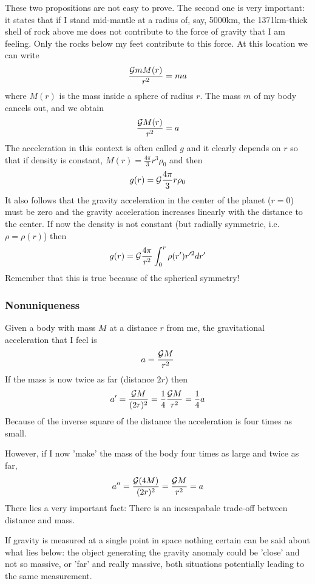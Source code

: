 These two propositions are not easy to prove. The second one is very important: it states
that if I stand mid-mantle at a radius of, say, 5000\si{\kilo\metre}, the 1371\si{\kilo\metre}-thick 
shell of rock above me does not contribute to the force of gravity that I am feeling. 
Only the rocks below my feet contribute to this force.
At this location we can write
\[
\frac{{\cal G}m M(r)}{r^2} = m a
\]
where $M(r)$ is the mass inside a sphere of radius $r$. The mass $m$ of my body cancels out, and we
obtain 
\[
\frac{{\cal G} M(r)}{r^2} = a
\]
The acceleration in this context is often called $g$ and it clearly depends on $r$ so that 
if density is constant, $M(r)=\frac{4\pi}{3}r^3\rho_0$ and then 
\[
g(r) = {\cal G} \frac{4\pi}{3}r\rho_0
\]
It also follows that the gravity acceleration in the center of the planet ($r=0$) must be zero and 
the gravity acceleration increases linearly with the distance to the center. 
If now the density is not constant (but radially symmetric, i.e. $\rho=\rho(r)$) then 
\[
g(r) =  {\cal G} \frac{4\pi}{r^2} \int_0^r \rho(r') r'^2 dr'
\]
Remember that this is true because of the spherical symmetry!

\subsubsection{Nonuniqueness}

Given a body with mass $M$ at a distance $r$ from me, the gravitational acceleration 
that I feel is 
\[
a = \frac{{\cal G} M}{r^2}
\]
If the mass is now twice as far (distance $2r$) then 
\[
a' = \frac{{\cal G} M}{(2r)^2} =  \frac{1}{4} \frac{{\cal G} M}{r^2} = \frac{1}{4}a
\]
Because of the inverse square of the distance the acceleration is four times as small. 

However, if I now 'make' the mass of the body four times as large and twice as far, 
\[
a'' = \frac{{\cal G} (4M)}{(2r)^2} = \frac{{\cal G} M}{r^2} =a
\]
There lies a very important fact: There is an inescapabale trade-off between distance 
and mass. 

If gravity is measured at a single point in space nothing certain can be said about 
what lies below: the object generating the gravity anomaly could be 'close' and 
not so massive, or 'far' and really massive, 
both situations potentially leading to the same measurement.

